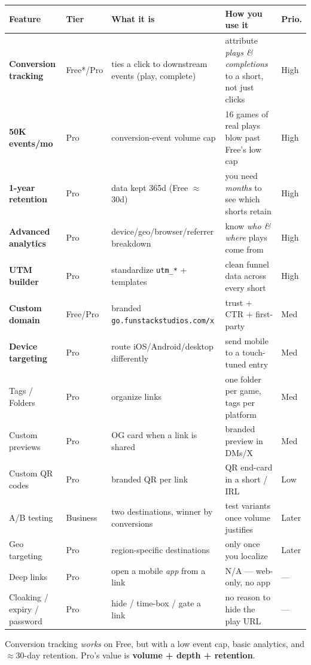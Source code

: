 \documentclass[11pt]{article}
\begin{document}
\begin{center}\footnotesize\setlength{\tabcolsep}{4pt}
\begin{tabular}{@{}P{2.2cm}P{1.4cm}P{3.7cm}P{4.7cm}P{0.9cm}@{}}
\toprule
Feature & Tier & What it is & How you use it & Prio. \\
\midrule
\textbf{Conversion tracking} & Free*/Pro & ties a click to downstream events (play, complete) & attribute \emph{plays \& completions} to a short, not just clicks & High \\
\textbf{50K events/mo} & Pro & conversion-event volume cap & 16 games of real plays blow past Free's low cap & High \\
\textbf{1-year retention} & Pro & data kept 365d (Free $\approx$30d) & you need \emph{months} to see which shorts retain & High \\
\textbf{Advanced analytics} & Pro & device/geo/browser/referrer breakdown & know \emph{who \& where} plays come from & High \\
\textbf{UTM builder} & Pro & standardize \texttt{utm\_*} + templates & clean funnel data across every short & High \\
\textbf{Custom domain} & Free/Pro & branded \texttt{go.funstackstudios.com/x} & trust + CTR + first-party & Med \\
\textbf{Device targeting} & Pro & route iOS/Android/desktop differently & send mobile to a touch-tuned entry & Med \\
Tags / Folders & Pro & organize links & one folder per game, tags per platform & Med \\
Custom previews & Pro & OG card when a link is shared & branded preview in DMs/X & Med \\
Custom QR codes & Pro & branded QR per link & QR end-card in a short / IRL & Low \\
A/B testing & Business & two destinations, winner by conversions & test variants once volume justifies & Later \\
Geo targeting & Pro & region-specific destinations & only once you localize & Later \\
Deep links & Pro & open a mobile \emph{app} from a link & N/A --- web-only, no app & --- \\
Cloaking / expiry / password & Pro & hide / time-box / gate a link & no reason to hide the play URL & --- \\
\bottomrule
\end{tabular}
\end{center}
\noindent\footnotesize *Conversion tracking \emph{works} on Free, but with a low event cap,
basic analytics, and $\approx$30-day retention. Pro's value is \textbf{volume + depth + retention}.\normalsize
\end{document}
